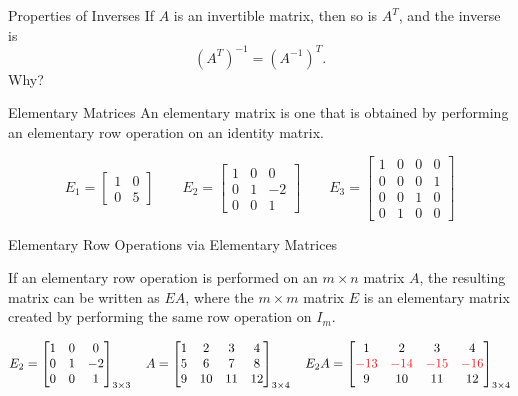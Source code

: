\documentclass[xcolor=dvipsnames,aspectratio=169,t]{beamer}
\begin{document}
\begin{frame}{Properties of Inverses}
  \bbox
    If $A$ is an invertible matrix, then so is $A^T$, and the inverse is 
    \[ \left( A^T \right)^{-1} = \left( A^{-1} \right)^T .\]
  \ebox
  Why?
\end{frame}

\begin{frame}{Elementary Matrices}
  \bbox
    An \alert{elementary matrix} is one that is obtained by performing an elementary row operation on an identity matrix.
  \ebox

  \[ 
    E_1 =  \begin{bmatrix} 1 & 0 \\ 0 & 5 \end{bmatrix}  \qquad
    E_2 =  \begin{bmatrix} 1 & 0  & 0 \\ 0 & 1 & -2 \\ 0 & 0 & 1 \end{bmatrix}  \qquad
    E_3 =  \begin{bmatrix} 1 & 0  & 0 & 0 \\ 0 & 0 & 0 & 1 \\ 0 & 0 & 1 & 0 \\ 0 & 1 & 0 & 0 \end{bmatrix}
  \]

  \vspace{0.5in}

\end{frame}
  
\begin{frame}{Elementary Row Operations via Elementary Matrices}
  \begin{theorem}
    If an elementary row operation is performed on an $m \times n$ matrix $A$, the resulting matrix can be written as $EA$, where the $m\times m$ matrix $E$ is an elementary matrix created by performing the same row operation on $I_m$.
  \end{theorem}
  
  \medskip
  
  \[
    E_2 =  \begin{bmatrix} 1 & 0  & 0 \\ 0 & 1 & -2 \\ 0 & 0 & 1 \end{bmatrix}_{3\times 3}
    \quad
    A = \begin{bmatrix} 1 & 2 & 3 & 4 \\ 5 & 6 & 7 & 8 \\ 9 & 10 & 11 & 12 \end{bmatrix}_{3 \times 4}
    \quad
    E_2 A =  \begin{bmatrix} 1 & 2 & 3 & 4 \\ \colorr{-13} & \colorr{-14} & \colorr{-15} & \colorr{-16} \\ 9 & 10 & 11 & 12 \end{bmatrix}_{3 \times 4}
  \]
\end{frame}
\end{document}
